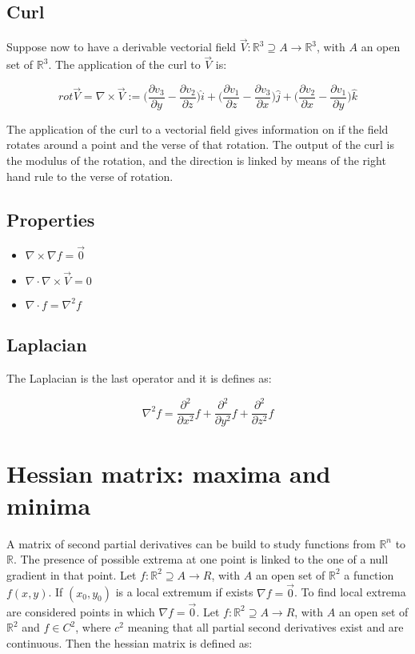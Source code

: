 	\subsection{Curl}
	Suppose now to have a derivable vectorial field $\vec{V}:\mathbb{R}^3\supseteq A \rightarrow\mathbb{R}^3$, with $A$ an open set of $\mathbb{R}^3$.
	The application of the curl to $\vec{V}$ is:

	$$rot\vec{V} = \nabla\times\vec{V} := \biggl(\frac{\partial v_3}{\partial y} - \frac{\partial v_2}{\partial z}\biggr)\hat{i} + \biggl(\frac{\partial v_1}{\partial z} - \frac{\partial v_3}{\partial x}\biggr)\hat{j} + \biggl(\frac{\partial v_2}{\partial x} - \frac{\partial v_1}{\partial y}\biggr)\hat{k}$$

	The application of the curl to a vectorial field gives information on if the field rotates around a point and the verse of that rotation.
	The output of the curl is the modulus of the rotation, and the direction is linked by means of the right hand rule to the verse of rotation.

	\subsection{Properties}

	\begin{multicols}{3}
		\begin{itemize}
			\item $\nabla\times\nabla f = \vec{0}$
			\item $\nabla\cdot\nabla\times\vec{V} = 0$
			\item $\nabla\cdot f = \nabla^2 f$
		\end{itemize}
	\end{multicols}

	\subsection{Laplacian}
	The Laplacian is the last operator and it is defines as:

	$$\nabla^2 f = \frac{\partial^2}{\partial x^2}f + \frac{\partial^2}{\partial y^2}f + \frac{\partial^2}{\partial z^2}f$$

\section{Hessian matrix: maxima and minima}
A matrix of second partial derivatives can be build to study functions from $\mathbb{R}^n$ to $\mathbb{R}$.
The presence of possible extrema at one point is linked to the one of a null gradient in that point.
Let $f:\mathbb{R}^2\supseteq A\rightarrow{R}$, with $A$ an open set of $\mathbb{R}^2$ a function $f(x,y)$.
If $(x_0, y_0)$ is a local extremum if exists $\nabla f = \vec{0}$.
To find local extrema are considered points in which $\nabla f = \vec{0}$.
Let $f:\mathbb{R}^2\supseteq A\rightarrow{R}$, with $A$ an open set of $\mathbb{R}^2$ and $f\in C^2$, where $c^2$ meaning that all partial second derivatives exist and are continuous.
Then the hessian matrix is defined as:

